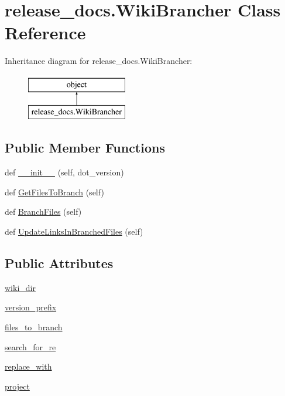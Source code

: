 \hypertarget{classrelease__docs_1_1WikiBrancher}{}\section{release\+\_\+docs.\+Wiki\+Brancher Class Reference}
\label{classrelease__docs_1_1WikiBrancher}
Inheritance diagram for release\+\_\+docs.\+Wiki\+Brancher\+:\begin{figure}[H]
\begin{center}
\leavevmode
\includegraphics[height=2.000000cm]{classrelease__docs_1_1WikiBrancher}
\end{center}
\end{figure}
\subsection*{Public Member Functions}
\begin{DoxyCompactItemize}
\item 
def \mbox{\hyperlink{classrelease__docs_1_1WikiBrancher_a344b32e2b65f0e8bab9fbf1e670d33fd}{\+\_\+\+\_\+init\+\_\+\+\_\+}} (self, dot\+\_\+version)
\item 
def \mbox{\hyperlink{classrelease__docs_1_1WikiBrancher_a05fc4282f501fb0210ecb33fd1d209a6}{Get\+Files\+To\+Branch}} (self)
\item 
def \mbox{\hyperlink{classrelease__docs_1_1WikiBrancher_a5ef284f7e1742f465ecd0c14d2667327}{Branch\+Files}} (self)
\item 
def \mbox{\hyperlink{classrelease__docs_1_1WikiBrancher_aa0bc4b1b78426fe7a8496d570b540f1d}{Update\+Links\+In\+Branched\+Files}} (self)
\end{DoxyCompactItemize}
\subsection*{Public Attributes}
\begin{DoxyCompactItemize}
\item 
\mbox{\hyperlink{classrelease__docs_1_1WikiBrancher_ad86478c9538ac0bf3916f67eb5da2910}{wiki\+\_\+dir}}
\item 
\mbox{\hyperlink{classrelease__docs_1_1WikiBrancher_aae330aeef850b105795c5d75727448ba}{version\+\_\+prefix}}
\item 
\mbox{\hyperlink{classrelease__docs_1_1WikiBrancher_a938c78ba6e8adfb6af039dd500ac6466}{files\+\_\+to\+\_\+branch}}
\item 
\mbox{\hyperlink{classrelease__docs_1_1WikiBrancher_a029ce9007fefd6ac5f13bacdedb29af5}{search\+\_\+for\+\_\+re}}
\item 
\mbox{\hyperlink{classrelease__docs_1_1WikiBrancher_aa33d991e629cc94fbfefe4f8569e283e}{replace\+\_\+with}}
\item 
\mbox{\hyperlink{classrelease__docs_1_1WikiBrancher_a4ac9c796f95690cca04049b557055443}{project}}
\end{DoxyCompactItemize}


